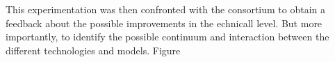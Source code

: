 \documentclass[
  11pt,
]{article}
\begin{document}
This experimentation was then confronted with the consortium to obtain a
feedback about the possible improvements in the echnicall level. But
more importantly, to identify the possible continuum and interaction
between the different technologies and models. Figure

\begin{figure}

\begin{minipage}[t]{0.67\linewidth}

{\centering 


}

\end{minipage}%
%
\begin{minipage}[t]{0.33\linewidth}

{\centering 

\raisebox{-\height}{

}}
\end{minipage}
\end{figure}
\end{document}
